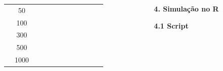 \documentclass[final]{beamer}
\begin{document}
\begin{frame}[t]
\begin{columns}[t,totalwidth=0.6\paperwidth]
\begin{column}{0.45\paperwidth}
\begin{table}[H]
\begin{tabular}{c|c|c|c|c|c|c|c|c|c|c|c}
                         &  50      &       &       &       &      &       &             &       &         &         &        \\
                         & 100      &       &       &       &      &       &             &       &         &         &        \\
                         & 300      &       &       &       &      &       &             &       &         &         &        \\
                         & 500      &       &       &       &      &       &             &       &         &         &        \\
                         & 1000     &       &       &       &      &       &             &       &         &         &        \\
    \hline \hline
    \end{tabular}
    \label{tab:inverted2}
\end{table}


\vspace{1em}
 \justifying
 
  \end{column}
  \hspace{0.02\paperwidth} 

  \begin{column}{0.45\textwidth}
 
{\large\bfseries 4. Simulação no R}\par
\justifying
\vspace{1.3cm}

{\large\bfseries 4.1 Script}\par
\vspace{1.3cm}


\end{column}
\end{columns}
\end{frame}
\end{document}
